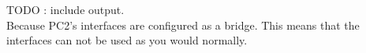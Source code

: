 TODO : include output. \\

Because PC2's interfaces are configured as a bridge. This means that the interfaces can not be used as you would normally.
